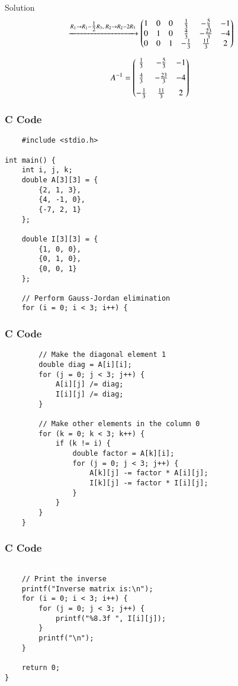 \documentclass{beamer}
\begin{document}
\begin{frame}{Solution}
\begin{align}
&\xrightarrow{R_1 \to R_1-\tfrac12R_3,\; R_2 \to R_2-2R_3}
\begin{pmatrix}1 & 0 & 0 & \tfrac13 & -\tfrac53 & -1 \\
       0 & 1 & 0 & \tfrac43 & -\tfrac{23}{3} & -4 \\
       0 & 0 & 1 & -\tfrac13 & \tfrac{11}{3} & 2\end{pmatrix}
\end{align}

\begin{align}
A^{-1} &=
\begin{pmatrix}\tfrac13 & -\tfrac53 & -1 \\[6pt]
       \tfrac43 & -\tfrac{23}{3} & -4 \\[6pt]
       -\tfrac13 & \tfrac{11}{3} & 2\end{pmatrix}
\end{align}
\end{frame}
\begin{frame}[fragile]
    \frametitle{C Code}
    \begin{lstlisting}
    #include <stdio.h>

int main() {
    int i, j, k;
    double A[3][3] = {
        {2, 1, 3},
        {4, -1, 0},
        {-7, 2, 1}
    };

    double I[3][3] = {
        {1, 0, 0},
        {0, 1, 0},
        {0, 0, 1}
    };

    // Perform Gauss-Jordan elimination
    for (i = 0; i < 3; i++) {
    \end{lstlisting}
    \end{frame}
\begin{frame}[fragile]
    \frametitle{C Code}
    \begin{lstlisting}
        // Make the diagonal element 1
        double diag = A[i][i];
        for (j = 0; j < 3; j++) {
            A[i][j] /= diag;
            I[i][j] /= diag;
        }

        // Make other elements in the column 0
        for (k = 0; k < 3; k++) {
            if (k != i) {
                double factor = A[k][i];
                for (j = 0; j < 3; j++) {
                    A[k][j] -= factor * A[i][j];
                    I[k][j] -= factor * I[i][j];
                }
            }
        }
    }
    \end{lstlisting}
    \end{frame}
\begin{frame}[fragile]
    \frametitle{C Code}
    \begin{lstlisting}

    // Print the inverse
    printf("Inverse matrix is:\n");
    for (i = 0; i < 3; i++) {
        for (j = 0; j < 3; j++) {
            printf("%8.3f ", I[i][j]);
        }
        printf("\n");
    }

    return 0;
}
\end{lstlisting}
\end{frame}
\end{document}
